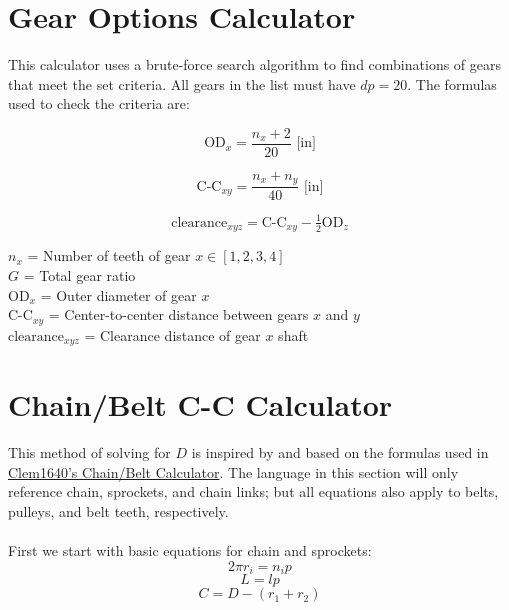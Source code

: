 \documentclass[11pt,a4paper,titlepage]{article}
\begin{document}
	\newpage
	\section{Gear Options Calculator}
	This calculator uses a brute-force search algorithm to find combinations of gears that meet the set criteria. All gears in the list must have $dp = 20$. The formulas used to check the criteria are:
	
	\begin{equation}
		\text{OD}_x = \frac{n_x + 2}{20} \text{ [in]}
	\end{equation}
	
	\begin{equation}
		\text{C-C}_{xy} = \frac{n_x + n_y}{40} \text{ [in]}
	\end{equation}
	
	\begin{equation}
		\text{clearance}_{xyz} = \text{C-C}_{xy} - \tfrac{1}{2} \text{OD}_z
	\end{equation}
	
	$n_x$ = Number of teeth of gear $x \in [1,2,3,4]$ \\
	$G$ = Total gear ratio \\
	$\text{OD}_x$ = Outer diameter of gear $x$ \\
	$\text{C-C}_{xy}$ = Center-to-center distance between gears $x$ and $y$ \\
	$\text{clearance}_{xyz}$ = Clearance distance of gear $x$ shaft
	
	\section{Chain/Belt C-C Calculator}
	This method of solving for $D$ is inspired by and based on the formulas used in \href{https://www.chiefdelphi.com/t/paper-chain-belt-calculator/168971}{Clem1640's Chain/Belt Calculator}. The language in this section will only reference chain, sprockets, and chain links; but all equations also apply to belts, pulleys, and belt teeth, respectively. \\ \\		
	First we start with basic equations for chain and sprockets:
	\begin{equation}
	2 \pi r_i = n_i p
	\end{equation}
	\begin{equation}
	L = l p
	\end{equation}
	\begin{equation}
	C = D - (r_1 + r_2)
	\end{equation}
	
\end{document}
